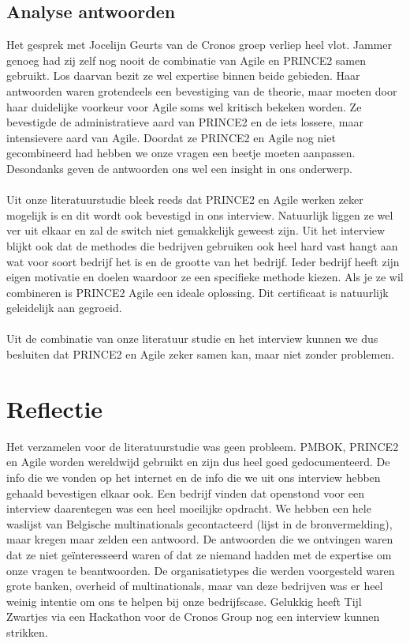 \documentclass[]{article}
\begin{document}
\subsection{Analyse antwoorden}
Het gesprek met Jocelijn Geurts van de Cronos groep verliep heel vlot. Jammer genoeg had zij zelf nog nooit de combinatie van Agile en PRINCE2 samen gebruikt. Los daarvan bezit ze wel expertise binnen beide gebieden. Haar antwoorden waren grotendeels een bevestiging van de theorie, maar moeten door haar duidelijke voorkeur voor Agile soms wel kritisch bekeken worden. Ze bevestigde de administratieve aard van PRINCE2 en de iets lossere, maar intensievere aard van Agile. Doordat ze PRINCE2 en Agile nog niet gecombineerd had hebben we onze vragen een beetje moeten aanpassen. Desondanks geven de antwoorden ons wel een insight in ons onderwerp. \\\\
Uit onze literatuurstudie bleek reeds dat PRINCE2 en Agile werken zeker mogelijk is en dit wordt ook bevestigd in ons interview. Natuurlijk liggen ze wel ver uit elkaar en zal de switch niet gemakkelijk geweest zijn. Uit het interview blijkt ook dat de methodes die bedrijven gebruiken ook heel hard vast hangt aan wat voor soort bedrijf het is en de grootte van het bedrijf. Ieder bedrijf heeft zijn eigen motivatie en doelen waardoor ze een specifieke methode kiezen. Als je ze wil combineren is PRINCE2 Agile een ideale oplossing. Dit certificaat is natuurlijk geleidelijk aan gegroeid. \\\\
Uit de combinatie van onze literatuur studie en het interview kunnen we dus besluiten dat PRINCE2 en Agile zeker samen kan, maar niet zonder problemen.

\section{Reflectie}
Het verzamelen voor de literatuurstudie was geen probleem. PMBOK, PRINCE2 en Agile worden wereldwijd gebruikt en zijn dus heel goed gedocumenteerd. De info die we vonden op het internet en de info die we uit ons interview hebben gehaald bevestigen elkaar ook. Een bedrijf vinden dat openstond voor een interview daarentegen was een heel moeilijke opdracht. We hebben een hele waslijst van Belgische multinationals gecontacteerd (lijst in de bronvermelding), maar kregen maar zelden een antwoord. De antwoorden die we ontvingen waren dat ze niet geïnteresseerd waren of dat ze niemand hadden met de expertise om onze vragen te beantwoorden. De organisatietypes die werden voorgesteld waren grote banken, overheid of multinationals, maar van deze bedrijven was er heel weinig intentie om ons te helpen bij onze bedrijfscase. Gelukkig heeft Tijl Zwartjes via een Hackathon voor de Cronos Group nog een interview kunnen strikken.
\end{document}
